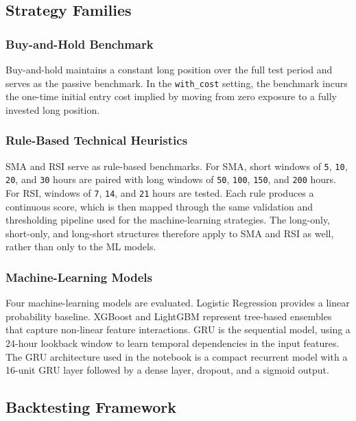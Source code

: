 \documentclass[12pt]{article}
\begin{document}
\subsection{Strategy Families}

\subsubsection{Buy-and-Hold Benchmark}

Buy-and-hold maintains a constant long position over the full test period and serves as the passive benchmark. In the \texttt{with\_cost} setting, the benchmark incurs the one-time initial entry cost implied by moving from zero exposure to a fully invested long position.

\subsubsection{Rule-Based Technical Heuristics}

SMA and RSI serve as rule-based benchmarks. For SMA, short windows of \texttt{5}, \texttt{10}, \texttt{20}, and \texttt{30} hours are paired with long windows of \texttt{50}, \texttt{100}, \texttt{150}, and \texttt{200} hours. For RSI, windows of \texttt{7}, \texttt{14}, and \texttt{21} hours are tested. Each rule produces a continuous score, which is then mapped through the same validation and thresholding pipeline used for the machine-learning strategies. The long-only, short-only, and long-short structures therefore apply to SMA and RSI as well, rather than only to the ML models.

\subsubsection{Machine-Learning Models}

Four machine-learning models are evaluated. Logistic Regression provides a linear probability baseline. XGBoost and LightGBM represent tree-based ensembles that capture non-linear feature interactions. GRU is the sequential model, using a 24-hour lookback window to learn temporal dependencies in the input features. The GRU architecture used in the notebook is a compact recurrent model with a 16-unit GRU layer followed by a dense layer, dropout, and a sigmoid output.

\subsection{Backtesting Framework}
\end{document}
